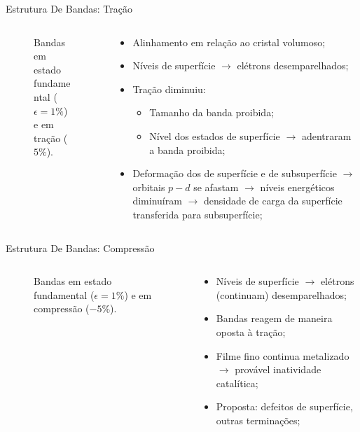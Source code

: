 \begin{frame}{Estrutura De Bandas: Tração}
	\begin{columns}
		\begin{column}{.6\textwidth}
			\begin{figure}[t]
				\centering
				
				\caption{Bandas em estado fundamental ($\epsilon = 1\%$) e em tração ($5\%$).\label{fig:bnd_str_tf_nn_t5}}
			\end{figure}
		\end{column}
		\begin{column}{.4\textwidth}
			\begin{itemize}
				\item Alinhamento em relação ao cristal volumoso;
				\item Níveis de superfície $\to$ elétrons desemparelhados;
				\item Tração \alert{diminuiu}:
				\begin{itemize}
					\item Tamanho da banda proibida;
					\item Nível dos estados de superfície $\to$ adentraram a banda proibida;
				\end{itemize}
				\item Deformação dos  de superfície e  de subsuperfície $\to$ orbitais $p-d$ se afastam $\to$ níveis energéticos diminuíram $\to$ densidade de carga da superfície transferida para subsuperfície;
			\end{itemize}		
		\end{column}
	\end{columns}
\end{frame}
\begin{frame}{Estrutura De Bandas: Compressão}
	\begin{columns}
		\begin{column}{.6\textwidth}
			\begin{figure}[t]
				\centering
				
				\caption{Bandas em estado fundamental ($\epsilon = 1\%$) e em compressão ($-5\%$).\label{fig:bnd_str_tf_nn_c5}}
			\end{figure}
		\end{column}
		\begin{column}{.4\textwidth}
			\begin{itemize}
				\item Níveis de superfície $\to$ elétrons (continuam) desemparelhados;
				\item Bandas reagem de maneira \alert{oposta} à tração;
				\item Filme fino continua metalizado $\to$ provável inatividade catalítica;
				\item Proposta: defeitos de superfície, outras terminações;
			\end{itemize}
		\end{column}
	\end{columns}
\end{frame}

